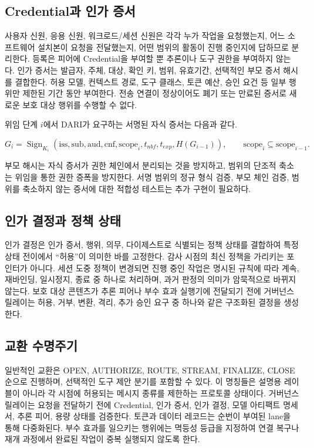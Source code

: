 \documentclass[10pt]{article}
\renewcommand{\textsc}[1]{\textsf{\MakeUppercase{#1}}}
\begin{document}
\subsection{Credential과 인가 증서}

사용자 신원, 응용 신원, 워크로드/세션 신원은 각각 누가 작업을 요청했는지, 어느 소프트웨어 설치본이 요청을 전달했는지, 어떤 범위의 활동이 진행 중인지에 답하므로 분리한다. 등록은 피어에 Credential을 부여할 뿐 추론이나 도구 권한을 부여하지 않는다. 인가 증서는 발급자, 주체, 대상, 확인 키, 범위, 유효기간, 선택적인 부모 증서 해시를 결합한다. 허용 모델, 컨텍스트 경로, 도구 클래스, 토큰 예산, 승인 요건 등 일부 행위만 제한된 기간 동안 부여한다. 전송 연결이 정상이어도 폐기 또는 만료된 증서로 새로운 보호 대상 행위를 수행할 수 없다.

위임 단계 $i$에서 DARI가 요구하는 서명된 자식 증서는 다음과 같다.

\begin{equation}
G_i = \operatorname{Sign}_{K_i}(\mathrm{iss},\mathrm{sub},\mathrm{aud},\mathrm{cnf},\mathrm{scope}_i,t_{nbf},t_{exp},H(G_{i-1})),
\qquad \mathrm{scope}_i \subseteq \mathrm{scope}_{i-1}.
\label{eq:attenuation}
\end{equation}

부모 해시는 자식 증서가 권한 체인에서 분리되는 것을 방지하고, 범위의 단조적 축소는 위임을 통한 권한 증폭을 방지한다. 서명 범위의 정규 형식 검증, 부모 체인 검증, 범위를 축소하지 않는 증서에 대한 적합성 테스트는 추가 구현이 필요하다.

\subsection{인가 결정과 정책 상태}

인가 결정은 인가 증서, 행위, 의무, 다이제스트로 식별되는 정책 상태를 결합하여 특정 상태 전이에서 ``허용''이 의미한 바를 고정한다. 감사 시점의 최신 정책을 가리키는 포인터가 아니다. 세션 도중 정책이 변경되면 진행 중인 작업은 명시된 규칙에 따라 계속, 재바인딩, 일시정지, 종료 중 하나로 처리하며, 과거 판정의 의미가 암묵적으로 바뀌지 않는다. 보호 대상 콘텐츠가 추론 피어나 부수 효과 실행기에 전달되기 전에 거버넌스 릴레이는 허용, 거부, 변환, 격리, 추가 승인 요구 중 하나와 같은 구조화된 결정을 생성한다.

\subsection{교환 수명주기}

일반적인 교환은 \textsc{open}, \textsc{authorize}, \textsc{route}, \textsc{stream}, \textsc{finalize}, \textsc{close} 순으로 진행하며, 선택적인 도구 제안 분기를 포함할 수 있다. 이 명칭들은 설명용 레이블이 아니라 각 시점에 허용되는 메시지 종류를 제한하는 프로토콜 상태이다. 거버넌스 릴레이는 요청을 전달하기 전에 Credential, 인가 증서, 인가 결정, 모델 아티팩트 명세서, 추론 피어, 용량 상태를 검증한다. 토큰과 데이터 레코드는 순번이 부여된 lane을 통해 다중화된다. 부수 효과를 일으키는 행위에는 멱등성 등급을 지정하여 연결 복구나 재개 과정에서 완료된 작업이 중복 실행되지 않도록 한다.
\end{document}
